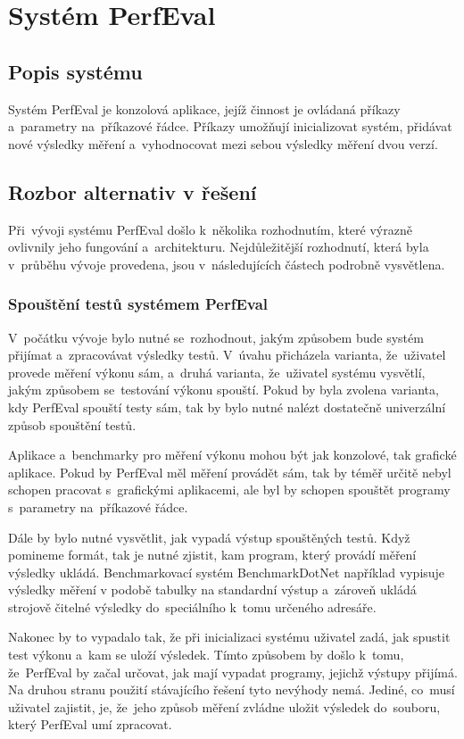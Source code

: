 \chapter{Systém PerfEval}

\section{Popis systému}

Systém PerfEval je konzolová aplikace, jejíž činnost je ovládaná příkazy a~parametry na~příkazové řádce.
Příkazy umožňují inicializovat systém, přidávat nové výsledky měření a~vyhodnocovat mezi sebou výsledky
měření dvou verzí.

\section{Rozbor alternativ v řešení}
Při~vývoji systému PerfEval došlo k~několika rozhodnutím, které výrazně ovlivnily jeho fungování a~architekturu.
Nejdůležitější rozhodnutí, která byla v~průběhu vývoje provedena, jsou v~následujících částech podrobně vysvětlena.

\subsection{Spouštění testů systémem PerfEval}
V~počátku vývoje bylo nutné se~rozhodnout, jakým způsobem bude systém přijímat a~zpracovávat výsledky testů.
V~úvahu přicházela varianta, že~uživatel provede měření výkonu sám, a~druhá varianta, že~uživatel systému
vysvětlí, jakým způsobem se~testování výkonu spouští. Pokud by byla zvolena varianta, kdy PerfEval spouští testy
sám, tak by bylo nutné nalézt dostatečně univerzální způsob spouštění testů.

Aplikace a~benchmarky pro měření výkonu mohou být jak konzolové, tak grafické aplikace. Pokud by PerfEval měl
měření provádět sám, tak by téměř určitě nebyl schopen pracovat s~grafickými aplikacemi, ale byl by schopen
spouštět programy s~parametry na~příkazové řádce.

Dále by bylo nutné vysvětlit, jak vypadá výstup spouštěných testů. Když pomineme formát, tak je nutné zjistit,
kam program, který provádí měření výsledky ukládá. Benchmarkovací systém BenchmarkDotNet například vypisuje
výsledky měření v podobě tabulky na standardní výstup a~zároveň ukládá strojově čitelné výsledky do~speciálního
k~tomu určeného adresáře.

Nakonec by to vypadalo tak, že při inicializaci systému uživatel zadá, jak spustit test výkonu a~kam se uloží výsledek.
Tímto způsobem by došlo k~tomu, že~PerfEval by začal určovat, jak mají vypadat programy, jejichž výstupy přijímá.
Na druhou stranu použití stávajícího řešení tyto nevýhody nemá. Jediné, co~musí uživatel zajistit, je, že~jeho
způsob měření zvládne uložit výsledek do~souboru, který PerfEval umí zpracovat.

